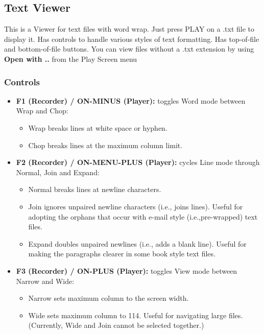 \subsection{Text Viewer}
This is a Viewer for text files with word wrap. Just press PLAY on a
.txt file to display it. Has controls to handle various styles of text
formatting. Has top{}-of{}-file and bottom{}-of{}-file buttons.  You
can view files without a .txt extension by using \textbf{Open with ..}
from the Play Screen menu

\subsubsection{Controls}

\begin{itemize}
\item \textbf{F1 (Recorder) / ON{}-MINUS (Player): }
toggles Word mode between Wrap and Chop:

\begin{itemize}
\item Wrap breaks lines at white space or hyphen.
\item Chop breaks lines at the maximum column limit.
\end{itemize}

\item \textbf{F2 (Recorder) / ON{}-MENU{}-PLUS (Player): }
cycles Line mode through Normal, Join and Expand:

\begin{itemize}
\item Normal breaks lines at newline characters.
\item Join ignores unpaired newline characters  (i.e., joins lines). Useful for
adopting the orphans that occur with e{}-mail style (i.e.,pre{}-wrapped) text files.
\item Expand doubles unpaired newlines (i.e., adds a blank line). Useful
for making the paragraphs clearer in some book style text files.
\end{itemize}

\item \textbf{F3 (Recorder) / ON{}-PLUS (Player):} 
toggles View mode between Narrow and Wide:

\begin{itemize}
\item Narrow sets maximum column to the screen width.
\item Wide sets maximum column to 114. Useful for navigating large
files. (Currently, Wide and Join cannot be selected together.)
\end{itemize}


\end{itemize}
